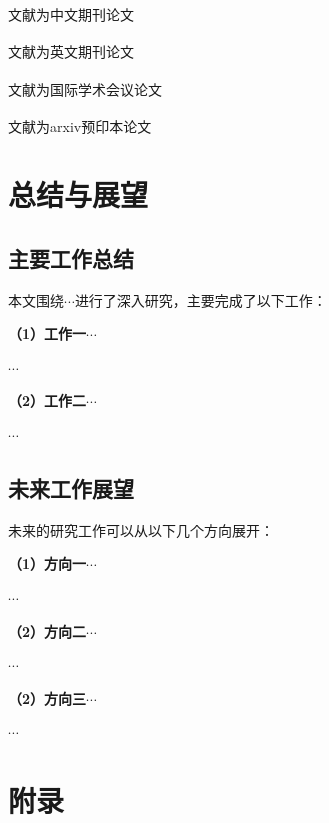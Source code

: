 \documentclass[]{WTUthesis}
\let\citen\cite
\renewcommand{\cite}[1]{\textsuperscript{\citen{#1}}}
\begin{document}
文献\cite{niu2,niu3}为中文期刊论文

文献\cite{ImageNet,TPAMI1,TPAMI2}为英文期刊论文

文献\cite{ECCV,Swin-T,ResNet-dilated}为国际学术会议论文

文献\cite{ASPP,VggNet,Vit}为arxiv预印本论文

\chapter{总结与展望}
\section{主要工作总结}
本文围绕$\cdots$进行了深入研究，主要完成了以下工作：

\textbf{（1）工作一$\cdots$}

$\cdots$

\textbf{（2）工作二$\cdots$}

$\cdots$

\section{未来工作展望}
未来的研究工作可以从以下几个方向展开：

\textbf{（1）方向一$\cdots$}

$\cdots$

\textbf{（2）方向二$\cdots$}

$\cdots$

\textbf{（2）方向三$\cdots$}

$\cdots$
\clearpage
{} 
  



\clearpage
\chapter*{附录}
\end{document}
